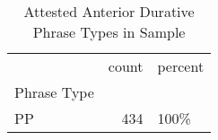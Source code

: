 \begin{table}[htbp!]
\centering
\caption{Attested Anterior Durative Phrase Types in Sample}
\label{table:antdur_phtype_ct}
\begin{tabular}{lrl}
\toprule
{} &  count & percent \\
Phrase Type &        &         \\
\midrule
PP          &    434 &    100\% \\
\bottomrule
\end{tabular}
\end{table}
